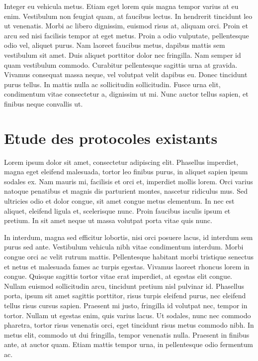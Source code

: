 \documentclass{report}
\begin{document}
Integer eu vehicula metus. Etiam eget lorem quis magna tempor varius at eu enim. Vestibulum non feugiat quam, at faucibus lectus. In hendrerit tincidunt leo ut venenatis. Morbi ac libero dignissim, euismod risus at, aliquam orci. Proin et arcu sed nisi facilisis tempor at eget metus. Proin a odio vulputate, pellentesque odio vel, aliquet purus. Nam laoreet faucibus metus, dapibus mattis sem vestibulum sit amet. Duis aliquet porttitor dolor nec fringilla. Nam semper id quam vestibulum commodo. Curabitur pellentesque sagittis urna at gravida. Vivamus consequat massa neque, vel volutpat velit dapibus eu. Donec tincidunt purus tellus. In mattis nulla ac sollicitudin sollicitudin. Fusce urna elit, condimentum vitae consectetur a, dignissim ut mi. Nunc auctor tellus sapien, et finibus neque convallis ut.

\section{Etude des protocoles existants}

Lorem ipsum dolor sit amet, consectetur adipiscing elit. Phasellus imperdiet, magna eget eleifend malesuada, tortor leo finibus purus, in aliquet sapien ipsum sodales ex. Nam mauris mi, facilisis et orci et, imperdiet mollis lorem. Orci varius natoque penatibus et magnis dis parturient montes, nascetur ridiculus mus. Sed ultricies odio et dolor congue, sit amet congue metus elementum. In nec est aliquet, eleifend ligula et, scelerisque nunc. Proin faucibus iaculis ipsum et pretium. In sit amet neque ut massa volutpat porta vitae quis nunc.

In interdum, magna sed efficitur lobortis, nisi orci posuere lacus, id interdum sem purus sed ante. Vestibulum vehicula nibh vitae condimentum interdum. Morbi congue orci ac velit rutrum mattis. Pellentesque habitant morbi tristique senectus et netus et malesuada fames ac turpis egestas. Vivamus laoreet rhoncus lorem in congue. Quisque sagittis tortor vitae erat imperdiet, at egestas elit congue. Nullam euismod sollicitudin arcu, tincidunt pretium nisl pulvinar id. Phasellus porta, ipsum sit amet sagittis porttitor, risus turpis eleifend purus, nec eleifend tellus risus cursus sapien. Praesent mi justo, fringilla id volutpat nec, tempor in tortor. Nullam ut egestas enim, quis varius lacus. Ut sodales, nunc nec commodo pharetra, tortor risus venenatis orci, eget tincidunt risus metus commodo nibh. In metus elit, commodo ut dui fringilla, tempor venenatis nulla. Praesent in finibus ante, at auctor quam. Etiam mattis tempor urna, in pellentesque odio fermentum ac.
\end{document}
